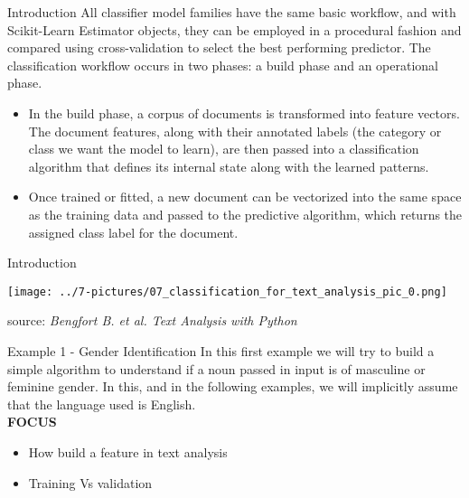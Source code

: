 \documentclass[11pt]{beamer}
\begin{document}
\begin{frame}{Introduction}
All classifier model families have the same basic workflow, and with Scikit-Learn Estimator objects, they can be employed in a procedural fashion and compared using cross-validation to select the best performing predictor.
The classification workflow occurs in two phases: a build phase and an operational phase.
	\begin{itemize}
		\item In the build phase, a corpus of documents is transformed into feature vectors. The document features, along with their annotated labels (the category or class we want the model to learn), are then passed into a classification algorithm that defines its internal state along with the learned patterns. 
		\item Once trained or fitted, a new document can be vectorized into the same space as the training data and passed to the predictive algorithm, which returns the assigned class label for the document.
	\end{itemize}
\end{frame}
\begin{frame}{Introduction}
	\begin{center}
	\texttt{[image: ../7-pictures/07\_classification\_for\_text\_analysis\_pic\_0.png]}
	\end{center}
	\footnotesize{source: \textit{Bengfort B. et al. Text Analysis with Python}}
\end{frame}
\begin{frame}{Example 1 - Gender Identification}
In this first example we will try to build a simple algorithm to understand if a noun passed in input is of masculine or feminine gender. In this, and in the following examples, we will implicitly assume that the language used is English.
\\
\vspace{0.5cm}
\textbf{FOCUS}
\\
	\begin{itemize}
		\item How build a feature in text analysis
		\item Training Vs validation
	\end{itemize}
\end{frame}
\end{document}
